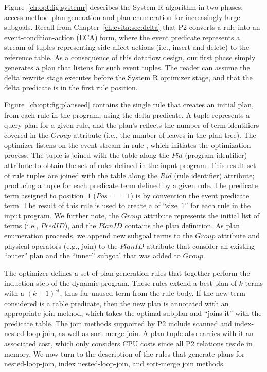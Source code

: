 Figure~\ref{ch:opt:fig:systemr} describes the System R algorithm in two phases;
access method plan generation and plan enumeration for increasingly large
subgoals.  Recall from Chapter~\ref{ch:evita:sec:delta} that P2 converts a rule
into an event-condition-action (ECA) form, where the event predicate represents
a stream of tuples representing side-affect actions (i.e., insert and delete)
to the reference table.  As a consequence of this dataflow design, our first
phase simply generates a plan that listens for such event tuples.  The reader
can assume the delta rewrite stage executes before the System R optimizer
stage, and that the delta predicate is in the first rule position.

Figure~\ref{ch:opt:fig:planseed} contains the single rule that creates an
initial plan, from each rule in the program, using the delta predicate.  A
 tuple represents a query plan for a given rule, and the plan's
 reflects the number of term identifiers covered in the $Group$
attribute (i.e., the number of leaves in the plan tree).  The optimizer listens
on the  event stream in rule , which
initiates the optimization process.  The  tuple is
joined with the  table along the $Pid$ (program identifier)
attribute to obtain the set of rules defined in the input program.  This result
set of rule tuples are joined with the  table along the
$Rid$ (rule identifier) attribute; producing a tuple for each predicate term
defined by a given rule.  The predicate term assigned to position~$1$ ($Pos ==
1$) is by convention the event predicate term.  The result of this rule is used
to create a  of ``size~$1$'' for each rule in the input program.  We
further note, the $Group$ attribute represents the initial list of terms (i.e.,
$PredID$), and the $PlanID$ contains the plan definition.  As plan enumeration
proceeds, we append new subgoal terms to the $Group$ attribute and physical
operators (e.g., join) to the $PlanID$ attribute that consider an existing
``outer'' plan and the ``inner'' subgoal that was added to $Group$.

The \OVERLOG optimizer defines a set of plan generation rules that together
perform the induction step of the dynamic program.  These rules extend a best
plan of $k$ terms with a $(k+1)^{st}$, thus far unused term from the rule body.
If the new term considered is a table predicate, then the new plan is annotated
with an appropriate join method, which takes the optimal subplan and ``joins
it'' with the predicate table.  The join methods supported by P2 include
scanned and index-nested-loop join, as well as sort-merge join.  A plan tuple
also carries with it an associated cost, which only considers CPU costs since
all P2 relations reside in memory.  We now turn to the description of the rules
that generate plans for nested-loop-join, index nested-loop-join, and
sort-merge join methods.

